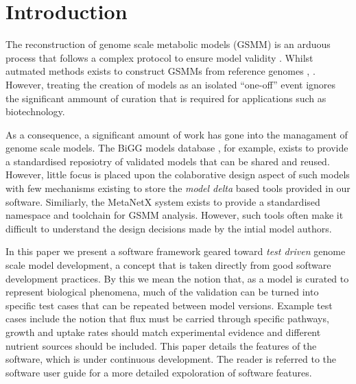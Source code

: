 \documentclass{bioinfo}
\begin{document}
\maketitle

\section{Introduction}
The reconstruction of genome scale metabolic models (GSMM) is an arduous process that follows a complex protocol to ensure model validity \cite{Palson}.
Whilst autmated methods exists to construct GSMMs from reference genomes \cite{ModelSEED, ScrumPy}, .
However, treating the creation of models as an isolated ``one-off'' event ignores the significant ammount of curation that is required for applications such as biotechnology.

As a consequence, a significant amount of work has gone into the managament of genome scale models.
The BiGG models database \cite{BiGG}, for example, exists to provide a standardised reposiotry of validated models that can be shared and reused.
However, little focus is placed upon the colaborative design aspect of such models with few mechanisms existing to store the \textit{model delta} based tools provided in our software.
Similiarly, the MetaNetX \cite{MetaNetX} system exists to provide a standardised namespace and toolchain for GSMM analysis.
However, such tools often make it difficult to understand the design decisions made by the intial model authors.

In this paper we present a software framework geared toward \textit{test driven} genome scale model development, a concept that is taken directly from good software development practices.
By this we mean the notion that, as a model is curated to represent biological phenomena, much of the validation can be turned into specific test cases that can be repeated between model versions.
Example test cases include the notion that flux must be carried through specific pathways, growth and uptake rates should match experimental evidence and different nutrient sources should be included.
This paper details the features of the software, which is under continuous development.
The reader is referred to the software user guide for a more detailed expoloration of software features.


\end{document}
